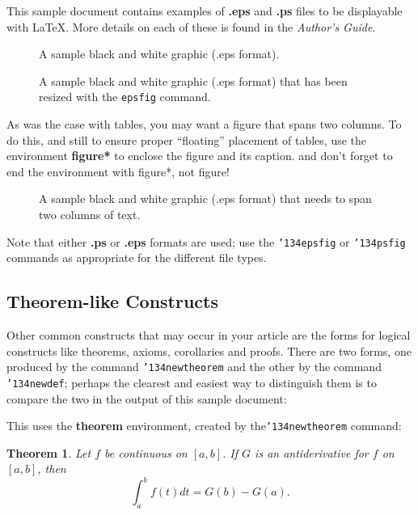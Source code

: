 \documentclass{sig-alternate}
\begin{document}
This sample document contains examples of \textbf{.eps}
and \textbf{.ps} files to be displayable with \LaTeX.  More
details on each of these is found in the \textit{Author's Guide}.

\begin{figure}
\centering
{}
\caption{A sample black and white graphic (.eps format).}
\end{figure}

\begin{figure}
\centering
{}
\caption{A sample black and white graphic (.eps format)
that has been resized with the \texttt{epsfig} command.}
\end{figure}


As was the case with tables, you may want a figure
that spans two columns.  To do this, and still to
ensure proper ``floating'' placement of tables, use the environment
\textbf{figure*} to enclose the figure and its caption.
and don't forget to end the environment with
{figure*}, not {figure}!

\begin{figure*}
\centering
{}
\caption{A sample black and white graphic (.eps format)
that needs to span two columns of text.}
\end{figure*}

Note that either {\textbf{.ps}} or {\textbf{.eps}} formats are
used; use
the \texttt{{\char'134}epsfig} or \texttt{{\char'134}psfig}
commands as appropriate for the different file types.

\subsection{Theorem-like Constructs}
Other common constructs that may occur in your article are
the forms for logical constructs like theorems, axioms,
corollaries and proofs.  There are
two forms, one produced by the
command \texttt{{\char'134}newtheorem} and the
other by the command \texttt{{\char'134}newdef}; perhaps
the clearest and easiest way to distinguish them is
to compare the two in the output of this sample document:

This uses the \textbf{theorem} environment, created by
the\linebreak\texttt{{\char'134}newtheorem} command:
\newtheorem{theorem}{Theorem}
\begin{theorem}
Let $f$ be continuous on $[a,b]$.  If $G$ is
an antiderivative for $f$ on $[a,b]$, then
\begin{displaymath}\int^b_af(t)dt = G(b) - G(a).\end{displaymath}
\end{theorem}
\end{document}
